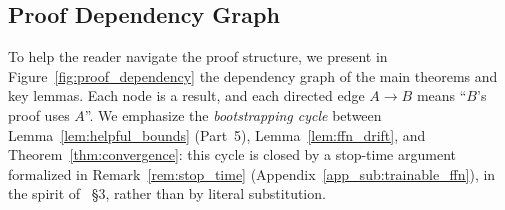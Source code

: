\documentclass[11pt]{article}
\let\citet\citep
\theoremstyle{plain}
\begin{document}
\subsection{Proof Dependency Graph}\label{app_sub:dependency_graph}

To help the reader navigate the proof structure, we present in Figure~\ref{fig:proof_dependency} the dependency graph of the main theorems and key lemmas. Each node is a result, and each directed edge $A\to B$ means ``$B$'s proof uses $A$''. We emphasize the {\it bootstrapping cycle} between Lemma~\ref{lem:helpful_bounds} (Part~5), Lemma~\ref{lem:ffn_drift}, and Theorem~\ref{thm:convergence}: this cycle is closed by a stop-time argument formalized in Remark~\ref{rem:stop_time} (Appendix~\ref{app_sub:trainable_ffn}), in the spirit of \citet{dzps19}~\S 3, rather than by literal substitution.
\end{document}
